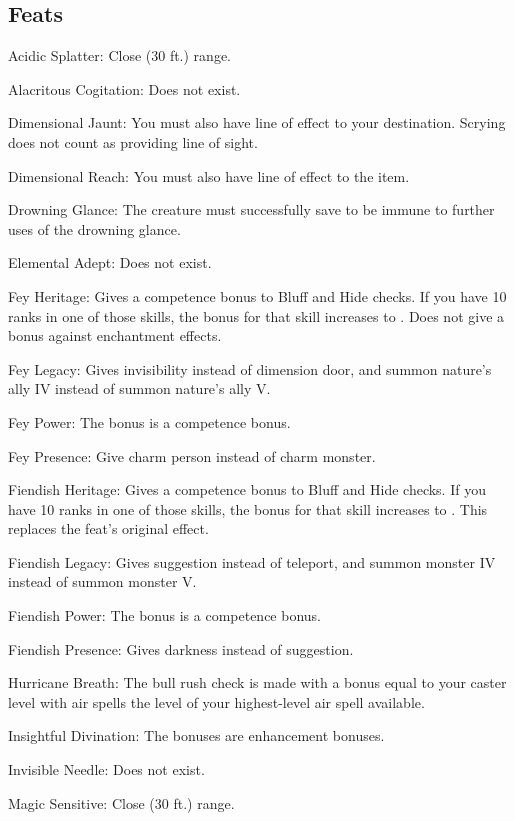 \subsection{Feats}
\begin{itemize*}
\item Acidic Splatter: Close (30 ft.) range.
\item Alacritous Cogitation: Does not exist.
\item Dimensional Jaunt: You must also have line of effect to your destination. Scrying does not count as providing line of sight.
\item Dimensional Reach: You must also have line of effect to the item.
\item Drowning Glance: The creature must successfully save to be immune to further uses of the drowning glance.
\item Elemental Adept: Does not exist.
\item Fey Heritage: Gives a  competence bonus to Bluff and Hide checks. If you have 10 ranks in one of those skills, the bonus for that skill increases to . Does not give a bonus against enchantment effects.
\item Fey Legacy: Gives invisibility instead of dimension door, and summon nature's ally IV instead of summon nature's ally V.
\item Fey Power: The bonus is a competence bonus.
\item Fey Presence: Give charm person instead of charm monster.
\item Fiendish Heritage: Gives a  competence bonus to Bluff and Hide checks. If you have 10 ranks in one of those skills, the bonus for that skill increases to . This replaces the feat's original effect.
\item Fiendish Legacy: Gives suggestion instead of teleport, and summon monster IV instead of summon monster V.
\item Fiendish Power: The bonus is a competence bonus.
\item Fiendish Presence: Gives darkness instead of suggestion.
\item Hurricane Breath: The bull rush check is made with a bonus equal to your caster level with air spells \add the level of your highest-level air spell available.
\item Insightful Divination: The bonuses are enhancement bonuses.
\item Invisible Needle: Does not exist.
\item Magic Sensitive: Close (30 ft.) range.

\end{itemize*}
